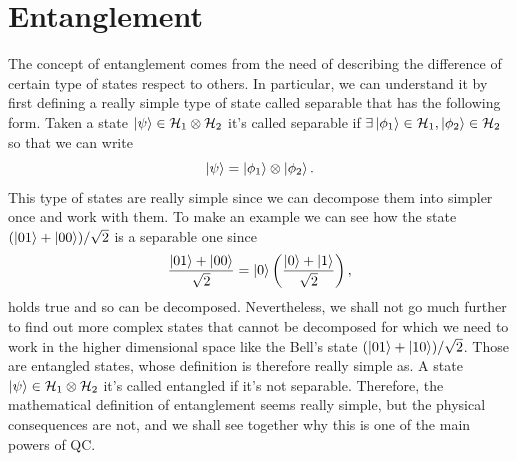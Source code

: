 \section{Entanglement}

The concept of entanglement comes from the need of describing the difference of certain type of states respect to others. In particular, we can understand it by first defining a really simple type of state called separable that has the following form.
{
    Taken a state $\ket{\psi}\in\mathcal{H}_1\otimes\mathcal{H}_2$ it's called separable if $\exists \ket{\phi_1}\in \mathcal{H}_1, \ket{\phi_2} \in \mathcal{H}_2$ so that we can write
    \begin{equation}
        \ket{\psi} = \ket{\phi_1}\otimes\ket{\phi_2}.
    \end{equation}
}
\noindent
This type of states are really simple since we can decompose them into simpler once and work with them. To make an example we can see how the state $(\ket{01} + \ket{00})/\sqrt{2}$ is a separable one since
\begin{equation}
    \frac{\ket{01} + \ket{00}}{\sqrt{2}} = \ket{0}\left( \frac{\ket{0} + \ket{1}}{\sqrt{2}} \right),
\end{equation}
holds true and so can be decomposed. Nevertheless, we shall not go much further to find out more complex states that cannot be decomposed for which we need to work in the higher dimensional space like the Bell's state $(\ket{01} + \ket{10})/\sqrt{2}$. Those are entangled states, whose definition is therefore really simple as.
{
    \label{def:Entangl}
    A state $\ket{\psi}\in\mathcal{H}_1\otimes\mathcal{H}_2$ it's called entangled if it's not separable.
}
\noindent
Therefore, the mathematical definition of entanglement seems really simple, but the physical consequences are not, and we shall see together why this is one of the main powers of QC.

